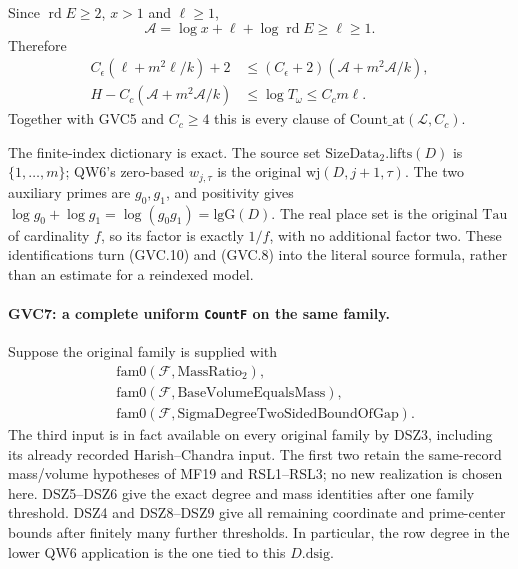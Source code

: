 Since $\operatorname{rd}E\ge2$, $x>1$ and $\ell\ge1$,
\[
 \mathcal A=\log x+\ell+\log\operatorname{rd}E\ge\ell\ge1.
\]
Therefore
\[
 \begin{split}
 C_\epsilon(\ell+m^2\ell/k)+2
 &\le(C_\epsilon+2)(\mathcal A+m^2\mathcal A/k),\\
 H-C_c(\mathcal A+m^2\mathcal A/k)
 &\le\log T_\omega\le C_cm\ell .
 \end{split}\tag{GVC.10}
\]
Together with GVC5 and $C_c\ge4$ this is every clause of
$\mathrm{Count\_at}(\mathcal L,C_c)$.

The finite-index dictionary is exact. The source set
$\mathrm{SizeData}_2.\mathrm{lifts}(D)$ is $\{1,\ldots,m\}$;
QW6's zero-based $w_{j,\tau}$ is the original
$\mathrm{wj}(D,j+1,\tau)$. The two auxiliary primes are $g_0,g_1$,
and positivity gives
$\log g_0+\log g_1=\log(g_0g_1)=\mathrm{lgG}(D)$.
The real place set is the original $\mathrm{Tau}$ of cardinality
$f$, so its factor is exactly $1/f$, with no additional factor two.
These identifications turn (GVC.10) and (GVC.8) into the literal
source formula, rather than an estimate for a reindexed model.

\paragraph{GVC7: a complete uniform \texttt{CountF} on the same family.}
\label{claim:GVC7}
Suppose the original family is supplied with
\[
 \begin{split}
 &\mathrm{fam0}(\mathcal F,\mathrm{MassRatio}_2),\\
 &\mathrm{fam0}(\mathcal F,\mathrm{BaseVolumeEqualsMass}),\\
 &\mathrm{fam0}(\mathcal F,\mathrm{SigmaDegreeTwoSidedBoundOfGap}).
 \end{split}                                                 \tag{GVC.11}
\]
The third input is in fact available on every original family
by DSZ3, including its already recorded Harish--Chandra input.
The first two retain the same-record mass/volume hypotheses of
MF19 and RSL1--RSL3; no new realization is chosen here.
DSZ5--DSZ6 give the exact degree and mass identities after one
family threshold. DSZ4 and DSZ8--DSZ9 give all remaining
coordinate and prime-center bounds after finitely many further
thresholds. In particular, the row degree in the lower QW6
application is the one tied to this $D.\mathrm{dsig}$.

